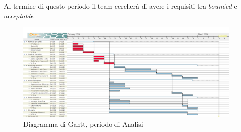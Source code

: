 Al termine di questo periodo il team \gruppo{} cercherà di avere i requisiti tra \textit{bounded} e \textit{acceptable}.\\
\begin{figure}[H] \centering \includegraphics[width=%
\textwidth]
{../modello/img/RR.png} \caption{Diagramma di Gantt, periodo di Analisi}
\end{figure}
